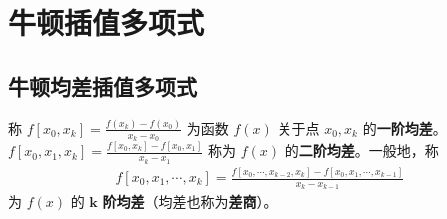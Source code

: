 \documentclass[../../main.tex]{subfiles}%
\begin{document}
\section{牛顿插值多项式}

\subsection{牛顿均差插值多项式}

\begin{definition}[均差]
称 $f[x_0, x_k] = \frac{f(x_k) - f(x_0)}{x_k - x_0}$ 为函数 $f(x)$ 关于点 $x_0, x_k$ 的\textbf{一阶均差}。$f[x_0, x_1, x_k] = \frac{f[x_0, x_k] - f[x_0, x_1]}{x_k - x_1}$ 称为 $f(x)$ 的\textbf{二阶均差}。一般地，称 
\begin{align}
f[x_0, x_1, \cdots, x_k] = \frac{f[x_0, \cdots, x_{k - 2}, x_k] - f[x_0, x_1, \cdots, x_{k - 1}]}{x_k - x_{k - 1}} \label{eq:数值分析-3.3}
\end{align}
为 $f(x)$ 的 $\boldsymbol{k}$ \textbf{阶均差}（均差也称为\textbf{差商}）。
\end{definition}
\end{document}
